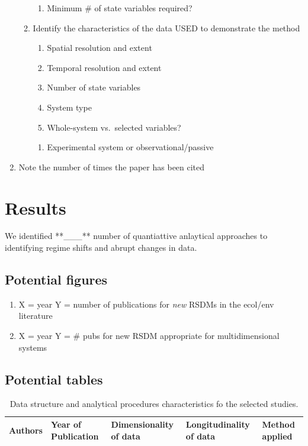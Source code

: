 \documentclass[12pt,twoside]{reedthesis}
\providecommand{\tightlist}{%
  \setlength{\itemsep}{0pt}\setlength{\parskip}{0pt}}
\def\labelenumi{\arabic{enumi}.}
\def\labelenumi{\arabic{enumi}.}
\begin{document}
\begin{enumerate}
\begin{enumerate}
\begin{enumerate}
    \item
      Minimum \# of state variables required?
    \end{enumerate}
  \item
    Identify the characteristics of the data USED to demonstrate the
    method
    \begin{enumerate}
    \def\labelenumiii{\alph{enumiii}.}
    \tightlist
    \item
      Spatial resolution and extent
    \item
      Temporal resolution and extent
    \item
      Number of state variables
    \item
      System type
    \item
      Whole-system vs.~selected variables?
    \end{enumerate}
    \begin{enumerate}
    \def\labelenumiii{\roman{enumiii}.}
    \setcounter{enumiii}{1}
    \tightlist
    \item
      Experimental system or observational/passive
    \end{enumerate}
  \end{enumerate}
\item
  Note the number of times the paper has been cited
\end{enumerate}
\section{Results}\label{results}

We identified **\_\_\_** number of quantiattive anlaytical approaches to
identifying regime shifts and abrupt changes in data.

\subsection{Potential figures}\label{potential-figures}
\begin{enumerate}
\def\labelenumi{\arabic{enumi}.}
\tightlist
\item
  X = year Y = number of publications for \emph{new} RSDMs in the
  ecol/env literature
\item
  X = year Y = \# pubs for new RSDM appropriate for multidimensional
  systems
\end{enumerate}
\subsection{Potential tables}\label{potential-tables}
\begin{longtable}[t]{lllll}
\caption{\label{tab:characteristicsResults}Data structure and analytical procedures characteristics fo the selected studies.}\\
\toprule
Authors & Year of Publication & Dimensionality of data & Longitudinality of data & Method applied\\
\bottomrule
\end{longtable}
\end{document}
